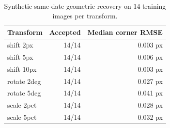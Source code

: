 \begin{table}[t]
\caption{Synthetic same-date geometric recovery on 14 training images per transform.}
\label{tab:registration}
\centering
\begin{tabular}{lrr}
\hline
Transform & Accepted & Median corner RMSE \\
\hline
shift 2px & 14/14 & 0.003 px \\
shift 5px & 14/14 & 0.006 px \\
shift 10px & 14/14 & 0.003 px \\
rotate 2deg & 14/14 & 0.027 px \\
rotate 5deg & 14/14 & 0.041 px \\
scale 2pct & 14/14 & 0.028 px \\
scale 5pct & 14/14 & 0.032 px \\
\hline
\end{tabular}
\end{table}
